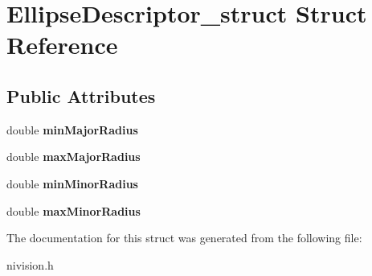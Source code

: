 \hypertarget{structEllipseDescriptor__struct}{
\section{EllipseDescriptor\_\-struct Struct Reference}
\label{structEllipseDescriptor__struct}
}
\subsection*{Public Attributes}
\begin{DoxyCompactItemize}
\item 
\hypertarget{structEllipseDescriptor__struct_a95e509054d0a8dd85837d51193c70d36}{
double {\bfseries minMajorRadius}}
\label{structEllipseDescriptor__struct_a95e509054d0a8dd85837d51193c70d36}

\item 
\hypertarget{structEllipseDescriptor__struct_a234c90ed0d9cdb54e384a284fe0128ad}{
double {\bfseries maxMajorRadius}}
\label{structEllipseDescriptor__struct_a234c90ed0d9cdb54e384a284fe0128ad}

\item 
\hypertarget{structEllipseDescriptor__struct_ae79345156a3c9bb5846bd93a88fa22d6}{
double {\bfseries minMinorRadius}}
\label{structEllipseDescriptor__struct_ae79345156a3c9bb5846bd93a88fa22d6}

\item 
\hypertarget{structEllipseDescriptor__struct_aadc00a86dd36647798f8a39bbfb26eb4}{
double {\bfseries maxMinorRadius}}
\label{structEllipseDescriptor__struct_aadc00a86dd36647798f8a39bbfb26eb4}

\end{DoxyCompactItemize}


The documentation for this struct was generated from the following file:\begin{DoxyCompactItemize}
\item 
nivision.h\end{DoxyCompactItemize}
